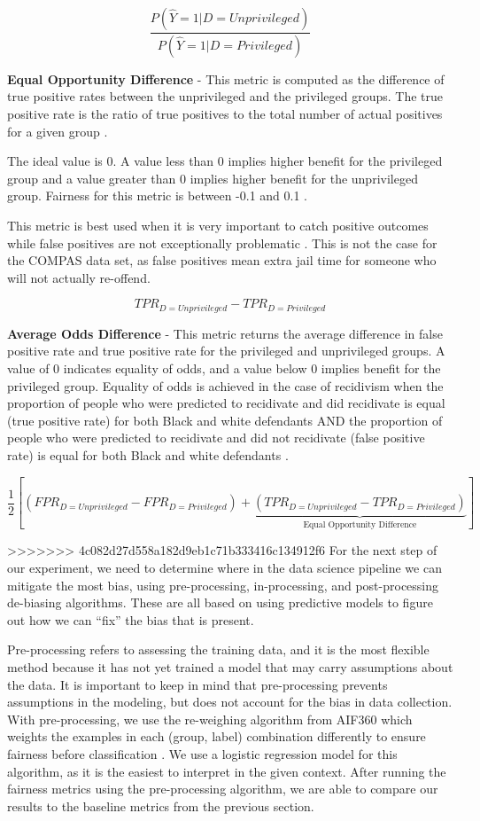 \documentclass[water,article,submit,moreauthors,pdftex]{mdpi}
\begin{document}
\[\frac{P(\hat{Y}=1|D=Unprivileged)}{P(\hat{Y}=1|D=Privileged)}\]

\textbf{Equal Opportunity Difference} - This metric is computed as the
difference of true positive rates between the unprivileged and the
privileged groups. The true positive rate is the ratio of true positives
to the total number of actual positives for a given group
\citep{GoogleDev}.

The ideal value is 0. A value less than 0 implies higher benefit for the
privileged group and a value greater than 0 implies higher benefit for
the unprivileged group. Fairness for this metric is between -0.1 and 0.1
\citep{aif360-oct-2018}.

This metric is best used when it is very important to catch positive
outcomes while false positives are not exceptionally problematic
\citep{Cortez2019How}. This is not the case for the COMPAS data set, as
false positives mean extra jail time for someone who will not actually
re-offend.

\[TPR_{D = Unprivileged} - TPR_{D = Privileged}\]

\textbf{Average Odds Difference} - This metric returns the average
difference in false positive rate and true positive rate for the
privileged and unprivileged groups. A value of 0 indicates equality of
odds, and a value below 0 implies benefit for the privileged group.
Equality of odds is achieved in the case of recidivism when the
proportion of people who were predicted to recidivate and did recidivate
is equal (true positive rate) for both Black and white defendants AND
the proportion of people who were predicted to recidivate and did not
recidivate (false positive rate) is equal for both Black and white
defendants \citep{aif360-oct-2018}.

\[\frac{1}{2}\left[(FPR_{D = Unprivileged} - FPR_{D = Privileged}) + \underbrace{(TPR_{D = Unprivileged} - TPR_{D = Privileged})}_\textrm{Equal Opportunity Difference}\right]\]

>>>>>>> 4c082d27d558a182d9eb1c71b333416c134912f6
For the next step of our experiment, we need to determine where in the
data science pipeline we can mitigate the most bias, using
pre-processing, in-processing, and post-processing de-biasing
algorithms. These are all based on using predictive models to figure out
how we can ``fix'' the bias that is present.

Pre-processing refers to assessing the training data, and it is the most
flexible method because it has not yet trained a model that may carry
assumptions about the data. It is important to keep in mind that
pre-processing prevents assumptions in the modeling, but does not
account for the bias in data collection. With pre-processing, we use the
re-weighing algorithm from AIF360 which weights the examples in each
(group, label) combination differently to ensure fairness before
classification \citep{aif360-oct-2018}. We use a logistic regression
model for this algorithm, as it is the easiest to interpret in the given
context. After running the fairness metrics using the pre-processing
algorithm, we are able to compare our results to the baseline metrics
from the previous section.
\end{document}
